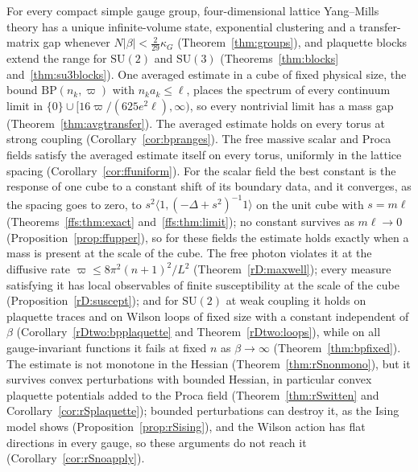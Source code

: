 \documentclass[aps,prd,twocolumn,superscriptaddress,nofootinbib,longbibliography,floatfix,amsmath,amssymb,10pt]{revtex4-2}
\theoremstyle{definition}
\theoremstyle{remark}
\newcommand{\SU}{\mathrm{SU}}
\begin{document}
For every compact simple gauge group, four-dimensional lattice Yang--Mills
theory has a unique infinite-volume state, exponential clustering and a
transfer-matrix gap whenever $N\lvert\beta\rvert<\frac2{29}\kappa_G$
(Theorem~\ref{thm:groups}), and plaquette blocks extend the range for
$\SU(2)$ and $\SU(3)$ (Theorems~\ref{thm:blocks} and~\ref{thm:su3blocks}).
One averaged estimate in a cube of fixed physical size, the bound
$\mathrm{BP}(n_k,\varpi)$ with $n_ka_k\le\ell$, places the spectrum of every
continuum limit in $\{0\}\cup[16\varpi/(625e^2\ell),\infty)$, so every
nontrivial limit has a mass gap (Theorem~\ref{thm:avgtransfer}). The
averaged estimate holds on every torus at strong coupling
(Corollary~\ref{cor:bpranges}). The free massive scalar and Proca fields satisfy the
averaged estimate itself on every torus, uniformly in the lattice spacing
(Corollary~\ref{cor:ffuniform}). For the scalar field the best constant is
the response of one cube to a constant shift of its boundary data, and it
converges, as the spacing goes to zero, to $s^2\langle1,(-\Delta+s^2)^{-1}1\rangle$
on the unit cube with $s=m\ell$ (Theorems~\ref{ffs:thm:exact}
and~\ref{ffs:thm:limit}); no constant survives as $m\ell\to0$
(Proposition~\ref{prop:ffupper}), so for these fields the estimate holds
exactly when a mass is present at the scale of the cube. The free photon violates it at the
diffusive rate $\varpi\le8\pi^2(n+1)^2/L^2$ (Theorem~\ref{rD:maxwell}); every
measure satisfying it has local observables of finite susceptibility at the
scale of the cube (Proposition~\ref{rD:suscept}); and for $\SU(2)$ at
weak coupling it holds on plaquette traces and on Wilson loops of fixed
size with a constant independent of $\beta$ (Corollary~\ref{rDtwo:bpplaquette}
and Theorem~\ref{rDtwo:loops}), while on all gauge-invariant functions it
fails at fixed $n$ as $\beta\to\infty$ (Theorem~\ref{thm:bpfixed}). The estimate is not
monotone in the Hessian (Theorem~\ref{thm:rSnonmono}), but it survives
convex perturbations with bounded Hessian, in particular convex plaquette
potentials added to the Proca field (Theorem~\ref{thm:rSwitten} and
Corollary~\ref{cor:rSplaquette}); bounded perturbations can destroy it, as the
Ising model shows (Proposition~\ref{prop:rSising}), and the Wilson action has
flat directions in every gauge, so these arguments do not reach it
(Corollary~\ref{cor:rSnoapply}).
\end{document}
